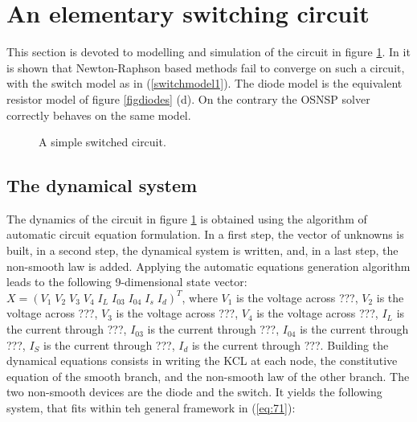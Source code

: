 \section{An elementary switching circuit}
\label{section3}


This section is devoted to modelling and simulation of the circuit in figure \ref{fig:figcircuit1}. In \cite{maffezzoni2006} it is shown that Newton-Raphson based methods fail to converge on such a circuit, with the switch model as in (\ref{switchmodel1}). The diode model is the equivalent resistor model of figure \ref{figdiodes} (d). On the contrary the OSNSP solver correctly behaves on the same model.  

\begin{figure}[h]
  \centering
   \scalebox{0.9}{
  
  }
  \caption{A simple switched circuit.}
  \label{fig:figcircuit1}
\end{figure}

\subsection{The dynamical system}
\label{section31}

The dynamics of the circuit in figure \ref{fig:figcircuit1} is obtained using the algorithm of automatic circuit equation formulation.
In a first step, the vector of unknowns is built, in a second step, the dynamical system is
written, and, in a last step, the non-smooth law is added. Applying the automatic equations generation algorithm leads to the following 9-dimensional state vector: $X=(V_1\;V_2\;V_3\;V_4\;I_L\;I_{03}\;I_{04}\;I_s\;I_d)^{T}$, where $V_{1}$ is the voltage across ???, $V_{2}$ is the voltage across ???, $V_{3}$ is the voltage across ???, $V_{4}$ is the voltage across ???, $I_{L}$ is the current through ???, $I_{03}$ is the current through ???, $I_{04}$ is the current through ???, $I_{S}$ is the current through ???, $I_{d}$ is the current through ???.  Building the dynamical equations consists in writing the KCL at each node, the constitutive equation of the smooth branch, and the
non-smooth law of the other branch. The two non-smooth devices are the diode and the switch. It yields the following system, that fits within teh general framework in (\ref{eq:71}): 

